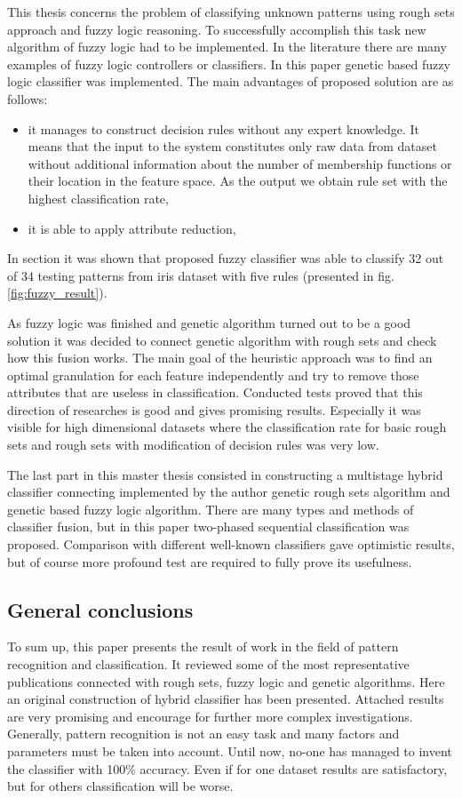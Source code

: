 This thesis concerns the problem of classifying unknown patterns using rough
sets approach and fuzzy logic reasoning. To successfully accomplish this task
new algorithm of fuzzy logic had to be implemented. In the literature there are
many examples of fuzzy logic controllers or classifiers. In this paper genetic
based fuzzy logic classifier was implemented. The main advantages of proposed
solution are as follows:
\begin{itemize}
    \item it manages to construct decision rules without any expert knowledge.
        It means that the input to the system constitutes only raw data from
        dataset without additional information about the number of membership
        functions or their location in the feature space. As the output we
        obtain rule set with the highest classification rate,
    \item it is able to apply attribute reduction,
\end{itemize}
In section \label{cha:Simulation_reaearch_3} it was shown that proposed fuzzy
classifier was able to classify 32 out of 34 testing patterns from iris dataset
with  five rules (presented in fig. \ref{fig:fuzzy_result}).

As fuzzy logic was finished and genetic algorithm turned out to be a good
solution it was decided to connect genetic algorithm with rough sets and check
how this fusion works. The main goal of the heuristic approach was to find an
optimal granulation for each feature independently and try to remove those
attributes that are useless in classification. Conducted tests proved that
this direction of researches is good and gives promising results. Especially it
was visible for high dimensional datasets where the classification rate for
basic rough sets and rough sets with modification of decision rules was very
low. 

The last part in this master thesis consisted in constructing a multistage 
hybrid classifier connecting implemented by the author genetic rough sets
algorithm and genetic based fuzzy logic algorithm. There are many types and
methods of classifier fusion, but in this paper two-phased sequential
classification was proposed. Comparison with different well-known classifiers
gave optimistic results, but of course more profound test are required to fully
prove its usefulness.
\subsection{General conclusions} 
To sum up, this paper presents the result of work in the field of pattern
recognition and classification. It reviewed some of the most representative 
publications connected with rough sets, fuzzy logic and genetic algorithms.
Here an original construction of hybrid classifier has been presented. Attached
results are very promising and encourage for further more complex
investigations. Generally, pattern recognition is not an easy task and many
factors and parameters must be taken into account. Until now, no-one has
managed to invent the classifier with 100\% accuracy. Even if for one dataset
results are satisfactory, but for others classification will be worse.
